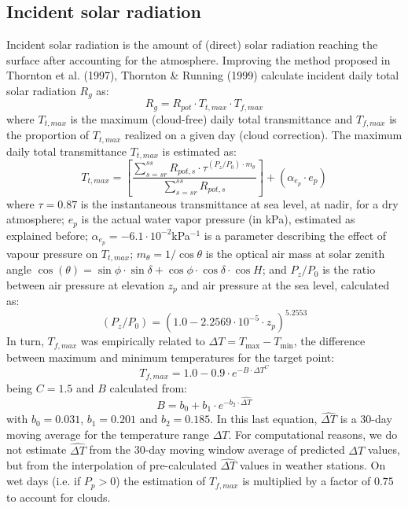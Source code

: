 \documentclass[11pt,a4paper]{article}
\begin{document}
\subsection{Incident solar radiation}
Incident solar radiation is the amount of (direct) solar radiation reaching the surface after accounting for the atmosphere. Improving the method proposed in Thornton et al. (1997), Thornton \& Running (1999) calculate incident daily total solar radiation $R_{g}$ as:
\begin{equation}
R_g = R_{pot} \cdot T_{t,max} \cdot T_{f,max}
\end{equation}
where $T_{t,max}$ is the maximum (cloud-free) daily total transmittance and $T_{f,max}$ is the proportion of $T_{t,max}$ realized on a given day (cloud correction). The maximum daily total transmittance $T_{t,max}$ is estimated as:
\begin{equation}
T_{t,max} = \left[\frac{\sum_{s = sr}^{ss}{R_{pot,s} \cdot \tau^{(P_z/P_0)\cdot m_{\theta}}}}{\sum_{s = sr}^{ss}{R_{pot,s}}}\right] + (\alpha_{e_p} \cdot {e_p})
\end{equation}
where $\tau = 0.87$ is the instantaneous transmittance at sea level, at nadir, for a dry atmosphere; ${e_p}$ is the actual water vapor pressure (in kPa), estimated as explained before; $\alpha_{e_p} = -6.1\cdot 10^{-2}$kPa$^{-1}$ is a parameter describing the effect of vapour pressure on $T_{t,max}$; $m_{\theta} = 1/\cos{\theta}$ is the optical air mass at solar zenith angle $\cos(\theta) = \sin{\phi}\cdot \sin{\delta}+\cos{\phi}\cdot \cos{\delta} \cdot \cos{H}$; and $P_z/P_0$ is the ratio between air pressure at elevation $z_p$ and air pressure at the sea level, calculated as:
\begin{equation}
(P_z/P_0) = (1.0 -2.2569\cdot 10^{-5}\cdot z_p)^{5.2553}
\end{equation}
In turn, $T_{f,max}$ was empirically related to $\Delta T = T_{\max} - T_{\min}$, the difference between maximum and minimum temperatures for the target point:
\begin{equation}
T_{f,max} = 1.0 - 0.9\cdot e^{-B \cdot {\Delta T}^{C}}
\end{equation}
being $C = 1.5$ and $B$ calculated from:
\begin{equation}
B = b_0 + b_1 \cdot e^{-b_2 \cdot {\hat{\Delta T}}}
\end{equation}
with $b_0 = 0.031$, $b_1 = 0.201$ and $b_2 = 0.185$. In this last equation,  $\hat{\Delta T}$ is a 30-day moving average for the temperature range $\Delta T$. For computational reasons, we do not estimate $\hat{\Delta T}$ from the 30-day moving window average of predicted $\Delta T$ values, but from the interpolation of pre-calculated $\hat{\Delta T}$ values in weather stations. On wet days (i.e. if $P_p > 0$) the estimation of $T_{f,max}$ is multiplied by a factor of $0.75$ to account for clouds.
\end{document}

